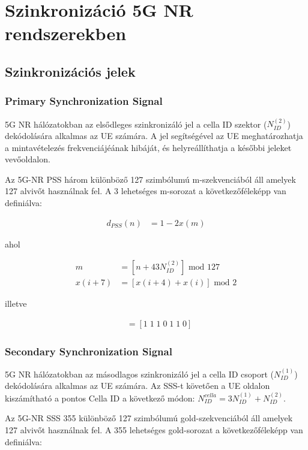 \chapter{Szinkronizáció 5G NR rendszerekben}

\section{Szinkronizációs jelek}

\subsection{Primary Synchronization Signal}

5G NR hálózatokban az elsődleges szinkronizáló jel a cella ID szektor ($N_{ID}^{(2)}$) dekódolására alkalmas az UE számára.
A jel segítségével az UE meghatározhatja a mintavételezés frekvenciájéának hibáját, és helyreállíthatja a későbbi jeleket vevőoldalon.

Az 5G-NR PSS három különböző 127 szimbólumú m-szekvenciából áll amelyek 127 alvivőt használnak fel. A 3 lehetséges m-sorozat a következőféleképp van definiálva:

\begin{align}
    d_{PSS}(n) &= 1-2x(m)
\end{align}

ahol

\begin{align}
    m &= [n+43N_{ID}^{(2)}] \text{ mod } 127\\
    x(i + 7) &= [x(i + 4) + x(i)] \text{ mod } 2
\end{align}

illetve

\begin{align}
    [x(6)\; x(5)\; x(4)\; x(3) \;x(2)\; x(1) \;x(0) ] &= [1 \;1\; 1\; 0\; 1\; 1\; 0]
\end{align}

\subsection{Secondary Synchronization Signal}

5G NR hálózatokban az másodlagos szinkronizáló jel a cella ID csoport ($N_{ID}^{(1)}$) dekódolására alkalmas az UE számára.
Az SSS-t követően a UE oldalon kiszámítható a pontos Cella ID a következő módon: $ N_{ID}^{cella} = 3 N_{ID}^{(1)} + N_{ID}^{(2)}$.

Az 5G-NR SSS 355 különböző 127 szimbólumú gold-szekvenciából áll amelyek 127 alvivőt használnak fel. A 355 lehetséges gold-sorozat a következőféleképp van definiálva:

